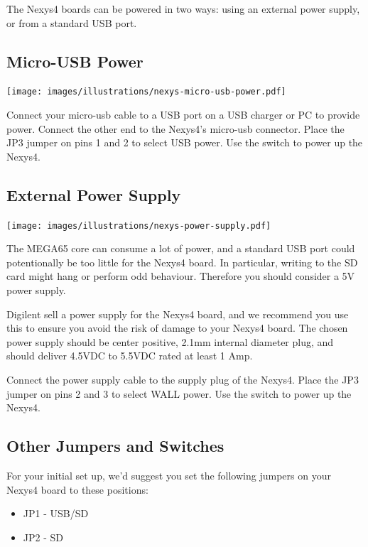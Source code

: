 The Nexys4 boards can be powered in two ways: using an external power supply, or from a standard USB port.

\subsection{Micro-USB Power}

\texttt{[image: images/illustrations/nexys-micro-usb-power.pdf]}

Connect your micro-usb cable to a USB port on a USB charger or PC to provide power. Connect the other end to the Nexys4's micro-usb connector. Place the JP3 jumper on pins 1 and 2 to select USB power. Use the switch to power up the Nexys4.

\subsection{External Power Supply}

\hspace*{1.7cm}
\texttt{[image: images/illustrations/nexys-power-supply.pdf]}

The MEGA65 core can consume a lot of power, and a standard USB port could potentionally be too little for the Nexys4 board. In particular, writing to the SD card might hang or perform odd behaviour. Therefore you should consider a 5V power supply.

Digilent sell a power supply for the Nexys4 board, and we recommend you use this to ensure you avoid the risk of damage to your Nexys4 board. The chosen power supply should be center positive, 2.1mm internal diameter plug, and should deliver 4.5VDC to 5.5VDC rated at least 1 Amp.

Connect the power supply cable to the supply plug of the Nexys4. Place the JP3 jumper on pins 2 and 3 to select WALL power. Use the switch to power up the Nexys4.

\subsection{Other Jumpers and Switches}

For your initial set up, we'd suggest you set the following jumpers on your Nexys4 board to these positions:

\begin{itemize}
  \item{JP1} - USB/SD
  \item{JP2} - SD
\end{itemize}

